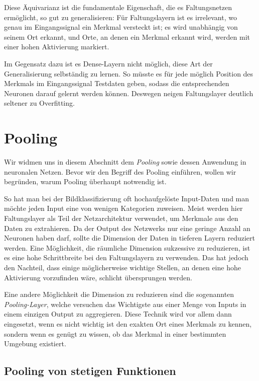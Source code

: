 \documentclass[paper=a4, 	%
		fontsize=11pt,
		abstract=true, 	%
		headsepline, 	%
		notitlepage	%
		]{scrartcl}
\theoremstyle{definition}
\begin{document}
Diese Äquivarianz ist die fundamentale Eigenschaft, die es Faltungsnetzen ermöglicht, so gut zu generalisieren:
Für Faltungslayern ist es irrelevant, wo genau im Eingangssignal ein Merkmal versteckt ist; es wird unabhängig von seinem Ort erkannt, und Orte, an denen ein Merkmal erkannt wird, werden mit einer hohen Aktivierung markiert.

Im Gegensatz dazu ist es Dense-Layern nicht möglich, diese Art der Generalisierung selbständig zu lernen.
So müsste es für jede möglich Position des Merkmals im Eingangssignal Testdaten geben, sodass die entsprechenden Neuronen darauf gelernt werden können.
Deswegen neigen Faltungslayer deutlich seltener zu Overfitting. 

\section{Pooling}

Wir widmen uns in diesem Abschnitt dem \emph{Pooling} sowie dessen Anwendung in neuronalen Netzen.
Bevor wir den Begriff des Pooling einführen, wollen wir begründen, warum Pooling überhaupt notwendig ist.

So hat man bei der Bildklassifizierung oft hochaufgelöste Input-Daten und man möchte jeden Input eine von wenigen Kategorien zuweisen.
Meist werden hier Faltungslayer als Teil der Netzarchitektur verwendet, um Merkmale aus den Daten zu extrahieren.
Da der Output des Netzwerks nur eine geringe Anzahl an Neuronen haben darf, sollte die Dimension der Daten in tieferen Layern reduziert werden.
Eine Möglichkeit, die räumliche Dimension sukzessive zu reduzieren, ist es eine hohe Schrittbreite bei den Faltungslayern zu verwenden.
Das hat jedoch den Nachteil, dass einige möglicherweise wichtige Stellen, an denen eine hohe Aktivierung vorzufinden wäre, schlicht übersprungen werden.

Eine andere Möglichkeit die Dimension zu reduzieren sind die sogenannten \emph{Pooling-Layer},
welche versuchen das Wichtigste aus einer Menge von Inputs in einem einzigen Output zu aggregieren.
Diese Technik wird vor allem dann eingesetzt, wenn es nicht wichtig ist den exakten Ort eines Merkmals zu kennen, sondern wenn es genügt zu wissen, ob das Merkmal in einer bestimmten Umgebung existiert.


\subsection{Pooling von stetigen Funktionen}
\end{document}
